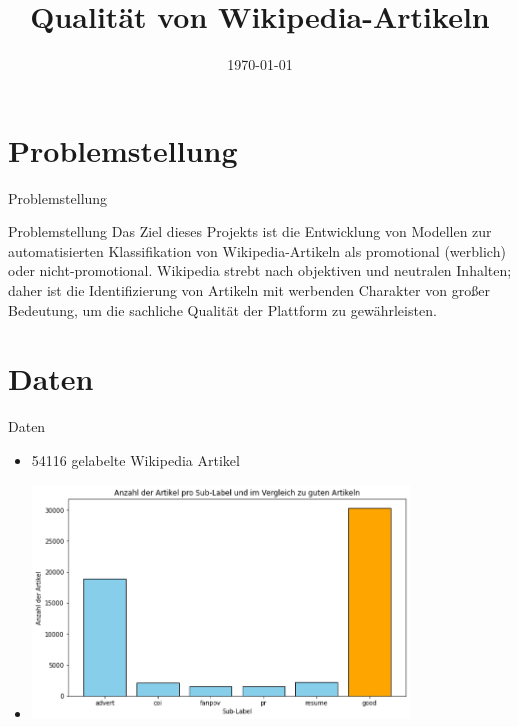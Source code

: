 \documentclass[aspectratio=169]{beamer} %
\title{Qualit\"at von Wikipedia-Artikeln}
\institute{Artificial Intelligence Group,\\
University of Hagen, Germany}
\date{\today}
\begin{document}




\begin{frame}
    \titlepage
\end{frame}
\nologo

\section{Problemstellung}

\begin{frame}{Problemstellung}
    \begin{block}{Problemstellung}
        Das Ziel dieses Projekts ist die Entwicklung von Modellen zur automatisierten Klassifikation von Wikipedia-Artikeln als promotional (werblich) oder nicht-promotional. Wikipedia strebt nach objektiven und neutralen Inhalten; daher ist die Identifizierung von Artikeln mit werbenden Charakter von gro\ss{}er Bedeutung, um die sachliche Qualit\"at der Plattform zu gew\"ahrleisten.
    \end{block}
\end{frame}

\section{Daten}

\begin{frame}{Daten}
    \begin{itemize}
        \item 54116 gelabelte Wikipedia Artikel

        \item \includegraphics[width=10cm]{figures/distribution_multiple_classes.png}
    \end{itemize}
\end{frame}
\end{document}
